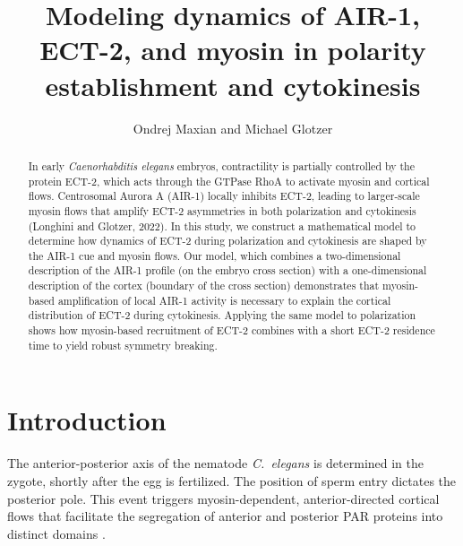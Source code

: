 \documentclass[11pt]{article}
\title{Modeling dynamics of AIR-1, ECT-2, and myosin in polarity establishment and cytokinesis \vspace{-0.5 cm}}
\author{Ondrej Maxian and Michael Glotzer \vspace{-0.75 cm}}
\begin{document}
\maketitle

\begin{abstract}
In early \emph{Caenorhabditis elegans} embryos, contractility is partially controlled by the protein ECT-2, which acts through the GTPase RhoA to activate myosin and cortical flows. Centrosomal Aurora A (AIR-1) locally inhibits ECT-2, leading to larger-scale myosin flows that amplify ECT-2 asymmetries in both polarization and cytokinesis (Longhini and Glotzer, 2022). In this study, we construct a mathematical model to determine how dynamics of ECT-2 during polarization and cytokinesis are shaped by the AIR-1 cue and myosin flows. Our model, which combines a two-dimensional description of the AIR-1 profile (on the embryo cross section) with a one-dimensional description of the cortex (boundary of the cross section) demonstrates that myosin-based amplification of local AIR-1 activity is necessary to explain the cortical distribution of ECT-2 during cytokinesis. Applying the same model to polarization shows how myosin-based recruitment of ECT-2 combines with a short ECT-2 residence time to yield robust symmetry breaking.
\end{abstract}

\section{Introduction}
The anterior-posterior axis of the nematode \emph{C.\ elegans} is determined in the zygote, shortly after the egg is fertilized.  The position of sperm entry dictates the posterior pole. This event triggers myosin-dependent, anterior-directed cortical flows that facilitate the segregation of anterior and posterior PAR proteins into distinct domains \citep{munro2004cortical, lang2017proteins, gross2019guiding}.
\end{document}
